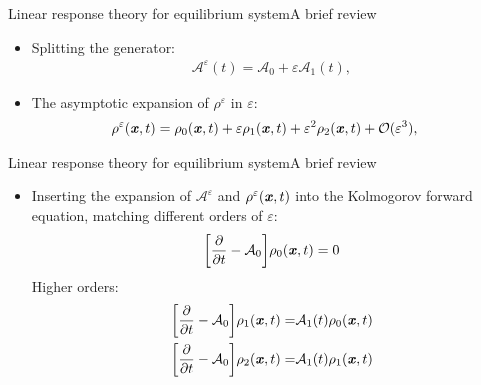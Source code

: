 \documentclass[fleqn]{beamer}
\newcommand{\bluec}[1]{{\color{blue} #1}}
\newcommand{\vect}[1]{\textbf{\textit{#1}}}
\newcommand{\fe}{u}
\newcommand{\mh}{\mathcal H}
\newcommand{\eps}{\varepsilon}
\newcommand{\mo}{\mathcal O}
\newcommand{\fwg}{{\mathcal A}}
\begin{document}
\begin{frame}{Linear response theory for equilibrium system}{A brief review}
  \begin{itemize}
  \item <1-> Splitting the generator:
    \bluec{
      \begin{align*}
        \fwg^\eps(t) = \fwg_0 + \eps\fwg_1(t),
      \end{align*}
    }
  \item <2-> The asymptotic expansion of \bluec{$\rho^\eps$} in \bluec{$\eps$}:
    \bluec{
      \begin{align*}
        \rho^\eps(\vect x, t) &= \rho_0(\vect x, t) + \eps \rho_1(\vect x, t)
        +\eps^2 \rho_2(\vect x, t) + \mo (\eps^3),        
      \end{align*}
    }
  \end{itemize}
\end{frame}


\begin{frame}{Linear response theory for equilibrium system}{A brief review}
  \begin{itemize}
  \item <1-> Inserting the expansion of
    \bluec{$\fwg^\eps$} and \bluec{$\rho^\eps(\vect x, t)$} into the
    Kolmogorov forward equation, matching different orders of \bluec{$\eps$}:
    \bluec{
      \begin{align*}
        \bigg[ \frac{\partial}{\partial t} - \fwg_0 \bigg]
        \rho_0(\vect x, t) = 0
      \end{align*}
    }
    Higher orders:
    \bluec{
      \begin{align*}
        \bigg[
        \frac{\partial}{\partial t}
        - \fwg_0
        \bigg]
        \rho_1(\vect x, t)
        =&
        \fwg_1(t) \rho_0(\vect x, t)\\\label{eqn:e-o2}
        \bigg[
        \frac{\partial}{\partial t}
        - \fwg_0
        \bigg]
        \rho_2(\vect x, t)
        =&
        \fwg_1(t) \rho_1(\vect x, t)        
      \end{align*}
    }
  \end{itemize}
\end{frame}
\end{document}

